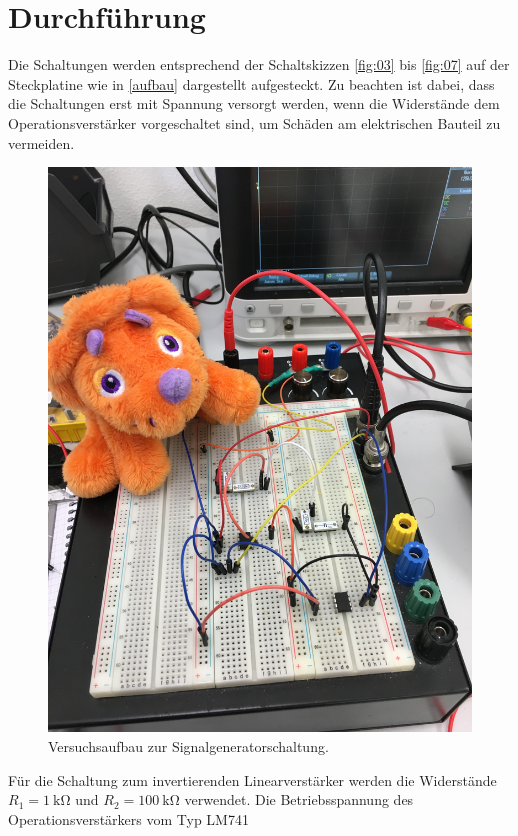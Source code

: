 \section{Durchführung}
\noindent Die Schaltungen werden entsprechend der Schaltskizzen \ref{fig:03} bis
\ref{fig:07} auf der Steckplatine wie in \autoref{aufbau} dargestellt
aufgesteckt. Zu beachten ist dabei, dass die Schaltungen erst mit Spannung
versorgt werden, wenn die Widerstände dem Operationsverstärker vorgeschaltet
sind, um Schäden am elektrischen Bauteil zu vermeiden. \\
\begin{figure}
  \centering
  \includegraphics[scale=0.03]{ressources/aufbau.JPG}
  \caption{Versuchsaufbau zur Signalgeneratorschaltung.}
  \label{aufbau}
\end{figure}
\noindent Für die Schaltung zum invertierenden Linearverstärker werden die
Widerstände $R_1 = \SI{1}{\kilo\ohm}$ und $R_2 = \SI{100}{\kilo\ohm}$
verwendet. Die Betriebsspannung des Operationsverstärkers vom Typ LM741
